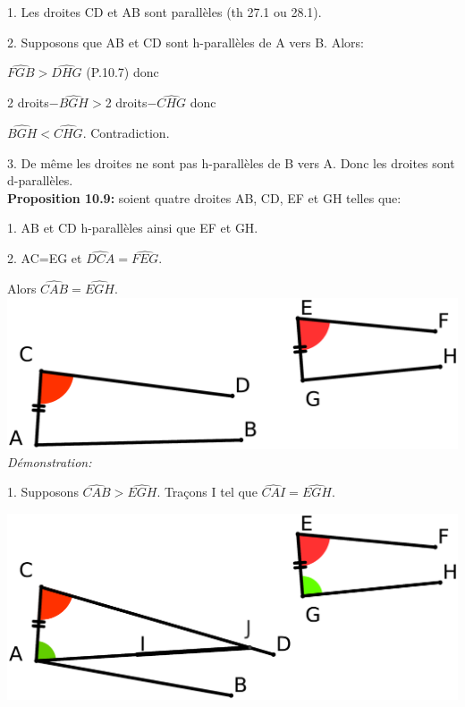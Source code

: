 \documentclass[a4paper, 12pt, twoside]{book}
\begin{document}
 1. Les droites CD et AB sont parallèles (th 27.1 ou 28.1).\
 
 2. Supposons que AB et CD sont h-parallèles de A vers B. Alors:\
 
 
 
 $\hat{FGB}>\hat{DHG}$ (P.10.7) donc\
 
 2 droits$-\hat{BGH}>$2 droits$-\hat{CHG}$ donc\
 
 $\hat{BGH}<\hat{CHG}$.  Contradiction.\
 
 3. De même les droites ne sont pas h-parallèles de B vers A. Donc les droites sont d-parallèles.\\
 
 
 
\textbf{Proposition 10.9:} soient quatre droites AB, CD, EF et GH telles que:\

1. AB et CD h-parallèles ainsi que EF et GH.\

2. AC=EG et   $\hat{DCA}=\hat{FEG}$.\

Alors  $\hat{CAB}=\hat{EGH}$.\\


  \includegraphics[scale=0.2]{figures/Lobat16.eps}\\ 
 
 
 \textit{Démonstration:}\
 
 1. Supposons  $\hat{CAB}>\hat{EGH}$. Traçons I tel que $\hat{CAI}=\hat{EGH}$.\
 
 
  \includegraphics[scale=0.2]{figures/Lobat17.eps}\\
  
\end{document}
